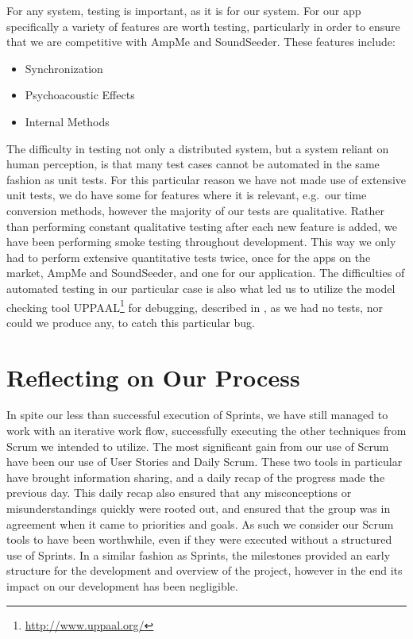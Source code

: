 \bigskip
For any system, testing is important, as it is for our system.
For our app specifically a variety of features are worth testing, particularly in order to ensure that we are competitive with AmpMe and SoundSeeder.
These features include:
\begin{multicols}{3}
\begin{itemize}
    \item Synchronization
    \item Psychoacoustic Effects
    \item Internal Methods
\end{itemize}
\end{multicols}

The difficulty in testing not only a distributed system, but a system reliant on human perception, is that many test cases cannot be automated in the same fashion as unit tests.
For this particular reason we have not made use of extensive unit tests, we do have some for features where it is relevant, e.g.\ our time conversion methods, however the majority of our tests are qualitative.
Rather than performing constant qualitative testing after each new feature is added, we have been performing smoke testing throughout development.
This way we only had to perform extensive quantitative tests twice, once for the apps on the market, AmpMe and SoundSeeder, and one for our application.
The difficulties of automated testing in our particular case is also what led us to utilize the model checking tool UPPAAL\footnote{\url{http://www.uppaal.org/}} for debugging, described in , as we had no tests, nor could we produce any, to catch this particular bug.

\section{Reflecting on Our Process}
In spite our less than successful execution of Sprints, we have still managed to work with an iterative work flow, successfully executing the other techniques from Scrum we intended to utilize.
The most significant gain from our use of Scrum have been our use of User Stories and Daily Scrum.
These two tools in particular have brought information sharing, and a daily recap of the progress made the previous day.
This daily recap also ensured that any misconceptions or misunderstandings quickly were rooted out, and ensured that the group was in agreement when it came to priorities and goals.
As such we consider our Scrum tools to have been worthwhile, even if they were executed without a structured use of Sprints.
In a similar fashion as Sprints, the milestones provided an early structure for the development and overview of the project, however in the end its impact on our development has been negligible.

